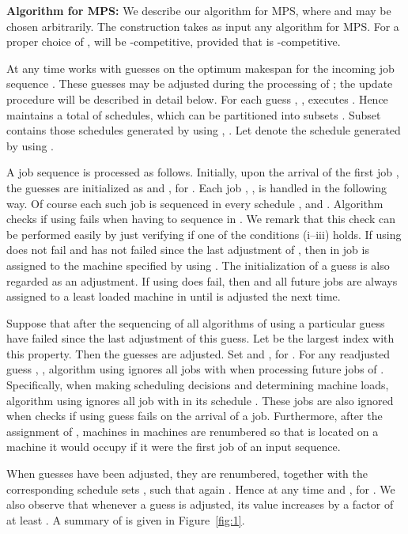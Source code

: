\documentclass{llncs}
\newcommand{\MPS}{{\rm MPS}}
\newcommand{\MPSO}{{\rm MPS}}
\begin{document}
\vspace*{0.1cm}

{\bf Algorithm for MPS:} We describe our algorithm  for \MPS, where 
 and  may be
chosen arbitrarily. The construction takes as input any algorithm 
for \MPSO. For a proper choice of ,  will be -competitive, provided
that  is -competitive. 

At any time  works with  guesses  on the optimum
makespan for the incoming job sequence . These guesses may be adjusted during the processing
of ; the update procedure will be described in detail below. For each guess , ,
 executes . Hence  maintains a total of  schedules,
which can be partitioned into subsets . Subset  contains
those schedules generated by  using , . Let 
denote the schedule generated by  using . 

A job sequence  is processed as follows. Initially, upon the arrival of the first job , the
guesses are initialized as  and , for . 
Each job , , is handled in the following way. Of course each such job is sequenced
in every schedule ,  and . Algorithm  
checks if  using  fails when having to sequence  in . We remark that this
check can be performed easily by just verifying if one of the conditions (i--iii) holds. If  using 
 does not fail and has not failed since the last adjustment of , then in 
job  is assigned to the machine specified by  using . The initialization of a
guess is also regarded as an adjustment.  If  using  does fail, then
 and all future jobs are always assigned to a least loaded machine in 
until  is adjusted the next time. 

Suppose that after the sequencing of  all algorithms of  using
a particular guess  have failed since the last adjustment of this guess. Let  be the
largest index  with this property. Then the guesses  are adjusted.
Set  and 
, for . For any readjusted  guess , 
, algorithm  using  ignores all jobs  with  when
processing future jobs of . Specifically, when making scheduling decisions and determining
machine loads, algorithm  using  ignores all job  with  in its schedule
. These jobs are also ignored when  checks if  using guess  fails
on the arrival of a job. Furthermore, after the assignment of , machines in  machines are renumbered
so that  is located on a machine it would occupy if it were the first job of an input sequence. 

When guesses have been adjusted, they are renumbered, together with the corresponding schedule sets , 
such that again . Hence at any time  and
, for . We also observe that whenever a guess is adjusted, its 
value increases by a factor of at least . A summary of  is given in Figure~\ref{fig:1}.
\end{document}
